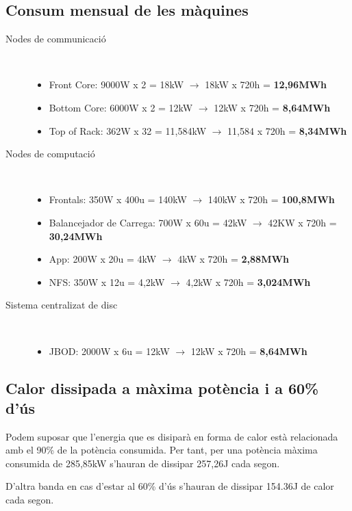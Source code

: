 \subsection{Consum mensual de les màquines}

\begin{description}
\item[Nodes de communicació] \hfill \\
        \vspace{-5mm}
        \begin{itemize}[leftmargin=*]
            \item Front Core: 9000W x 2 = 18kW $\rightarrow$  18kW x 720h = \textbf{12,96MWh}
            \item Bottom Core: 6000W x 2 = 12kW $\rightarrow$  12kW x 720h = \textbf{8,64MWh}
            \item Top of Rack: 362W x 32 = 11,584kW $\rightarrow$ 11,584 x 720h = \textbf{8,34MWh}
        \end{itemize}
        
        \item[Nodes de computació] \hfill \\
        \vspace{-5mm}
        \begin{itemize}[leftmargin=*]
            \item Frontals: 350W x 400u = 140kW $\rightarrow$  140kW x 720h = \textbf{100,8MWh}
            \item Balancejador de Carrega: 700W x 60u = 42kW $\rightarrow$  42KW x 720h = \textbf{30,24MWh}
            \item App: 200W x 20u = 4kW $\rightarrow$  4kW x 720h = \textbf{2,88MWh}
            \item NFS: 350W x 12u = 4,2kW $\rightarrow$  4,2kW x 720h = \textbf{3,024MWh}
        \end{itemize}
        
        \item[Sistema centralizat de disc] \hfill \\
        \vspace{-5mm}
        \begin{itemize}[leftmargin=*]
            \item JBOD: 2000W x 6u = 12kW $\rightarrow$  12kW x 720h = \textbf{8,64MWh}
        \end{itemize}
        
\end{description}

\subsection{Calor dissipada a màxima potència i a 60\% d'ús}

Podem suposar que l'energia que es disiparà en forma de calor està relacionada amb el 90\% de la potència consumida. Per tant, per una potència màxima consumida de 285,85kW s'hauran de dissipar 257,26J cada segon.

D'altra banda en cas d'estar al 60\% d'ús s'hauran de dissipar 154.36J de calor cada segon.



